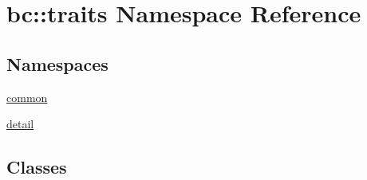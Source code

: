 \hypertarget{namespacebc_1_1traits}{}\section{bc\+:\+:traits Namespace Reference}
\label{namespacebc_1_1traits}
\subsection*{Namespaces}
\begin{DoxyCompactItemize}
\item 
 \hyperlink{namespacebc_1_1traits_1_1common}{common}
\item 
 \hyperlink{namespacebc_1_1traits_1_1detail}{detail}
\end{DoxyCompactItemize}
\subsection*{Classes}
